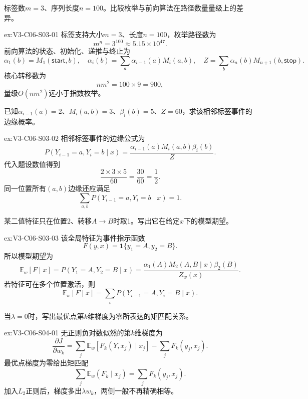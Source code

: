 \begin{SLChapterExercisePairSection}
\begin{exercise}\label{ex:V3-C06-S03-01}
标签数$m=3$、序列长度$n=100$。比较枚举与前向算法在路径数量量级上的差异。
\end{exercise}
\ifSLFullEdition
{}\label{sol:V3-C06-S03-01}
\begin{chapterexercisesolution}{ex:V3-C06-S03-01}
标签支持大小$m=3$、长度$n=100$，枚举路径数为
\[
m^n=3^{100}\approx5.15\times10^{47}.
\]
前向算法的状态、初始化、递推与终止为
\[
\alpha_1(b)=M_1(\mathsf{start},b),
\quad
\alpha_i(b)=\sum_a\alpha_{i-1}(a)M_i(a,b),
\quad
Z=\sum_b\alpha_n(b)M_{n+1}(b,\mathsf{stop}).
\]
核心转移数为
\[
n m^2=100\times9=900,
\]
量级$O(nm^2)$远小于指数枚举。
\end{chapterexercisesolution}
\fi

\begin{exercise}\label{ex:V3-C06-S03-02}
已知$\alpha_{i-1}(a)=2$、$M_i(a,b)=3$、$\beta_i(b)=5$、$Z=60$，求该相邻标签事件的边缘概率。
\end{exercise}
\ifSLFullEdition
{}\label{sol:V3-C06-S03-02}
\begin{chapterexercisesolution}{ex:V3-C06-S03-02}
相邻标签事件的边缘公式为
\[
P(Y_{i-1}=a,Y_i=b\mid x)
=\frac{\alpha_{i-1}(a)M_i(a,b)\beta_i(b)}{Z}.
\]
代入题设数值得到
\[
\frac{2\times3\times5}{60}
=\frac{30}{60}=\frac12.
\]
同一位置所有$(a,b)$边缘还应满足
\[
\sum_{a,b}P(Y_{i-1}=a,Y_i=b\mid x)=1.
\]
\end{chapterexercisesolution}
\fi

\begin{exercise}\label{ex:V3-C06-S03-03}
某二值特征只在位置2、转移$A\to B$时取1。写出它在给定$x$下的模型期望。
\end{exercise}
\ifSLFullEdition
{}\label{sol:V3-C06-S03-03}
\begin{chapterexercisesolution}{ex:V3-C06-S03-03}
该全局特征为事件指示函数
\[
F(y,x)=\mathbf1\{y_1=A,y_2=B\}.
\]
所以模型期望为
\[
\mathbb E_w[F\mid x]
=P(Y_1=A,Y_2=B\mid x)
=\frac{\alpha_1(A)M_2(A,B\mid x)\beta_2(B)}{Z_w(x)}.
\]
若特征可在多个位置激活，则
\[
\mathbb E_w[F\mid x]
=\sum_iP(Y_{i-1}=A,Y_i=B\mid x).
\]
\end{chapterexercisesolution}
\fi

\begin{exercise}\label{ex:V3-C06-S04-01}
当$\lambda=0$时，写出最优点第$k$维梯度为零所表达的矩匹配关系。
\end{exercise}
\ifSLFullEdition
{}\label{sol:V3-C06-S04-01}
\begin{chapterexercisesolution}{ex:V3-C06-S04-01}
无正则负对数似然的第$k$维梯度为
\[
\frac{\partial J}{\partial w_k}
=\sum_j\mathbb E_w[F_k(Y,x_j)\mid x_j]
-\sum_jF_k(y_j,x_j).
\]
最优点梯度为零给出矩匹配
\[
\sum_j\mathbb E_w(F_k\mid x_j)
=\sum_jF_k(y_j,x_j).
\]
加入$L_2$正则后，梯度多出$\lambda w_k$，两侧一般不再精确相等。
\end{chapterexercisesolution}
\fi


\end{SLChapterExercisePairSection}
